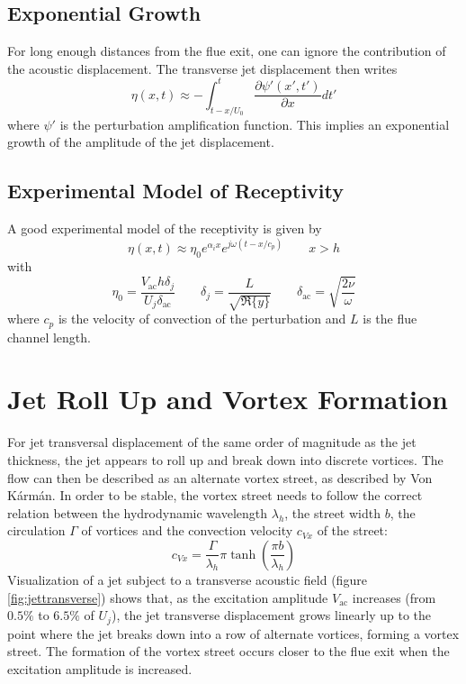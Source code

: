 \subsection{Exponential Growth}

For long enough distances from the flue exit, one can ignore the contribution of the acoustic displacement. The transverse jet displacement then writes
\[
\eta(x,t)\approx -\int_{t-x/U_0}^{t}\frac{\partial\psi'(x',t')}{\partial x}dt'
\]
where \( \psi' \) is the perturbation amplification function. This implies an exponential growth of the amplitude of the jet displacement.

\subsection{Experimental Model of Receptivity}

A good experimental model of the receptivity is given by
\[
\eta(x,t)\approx \eta_0e^{\alpha_i x}e^{j\omega\left(t-x/c_p\right)}
\qquad
x>h
\]
with
\[
\eta_0=\frac{V_{\mathrm{ac}}h\delta_j}{U_j\delta_{\mathrm{ac}}}
\qquad
\delta_j=\frac{L}{\sqrt{\Re\{y\}}}
\qquad
\delta_{\mathrm{ac}}=\sqrt{\frac{2\nu}{\omega}}
\]
where \(c_p\) is the velocity of convection of the perturbation and \(L\) is the flue channel length.

\section{Jet Roll Up and Vortex Formation}

For jet transversal displacement of the same order of magnitude as the jet thickness, the jet appears to roll up and break down into discrete vortices. The flow can then be described as an alternate vortex street, as described by Von K\'arm\'an. In order to be stable, the vortex street needs to follow the correct relation between the hydrodynamic wavelength \( \lambda_h \), the street width \( b \), the circulation \( \Gamma \) of vortices and the convection velocity \( c_{Vx} \) of the street:
\[
c_{Vx}=\frac{\Gamma}{\lambda_h}\pi\tanh\left(\frac{\pi b}{\lambda_h}\right)
\]
Visualization of a jet subject to a transverse acoustic field (figure \ref{fig:jettransverse}) shows that, as the excitation amplitude \(V_{\mathrm{ac}}\) increases (from \(0.5\%\) to \(6.5\%\) of \(U_j\)), the jet transverse displacement grows linearly up to the point where the jet breaks down into a row of alternate vortices, forming a vortex street. The formation of the vortex street occurs closer to the flue exit when the excitation amplitude is increased. 

